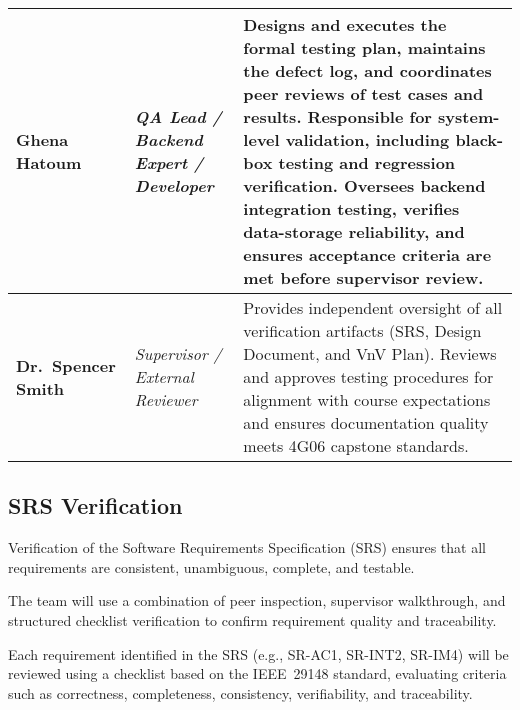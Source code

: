 \documentclass[12pt, titlepage]{article}
\begin{document}
\begin{center}
\begin{longtable}{|>{\raggedright\arraybackslash}p{}|
                    >{\raggedright\arraybackslash}p{}|
                    >{\raggedright\arraybackslash}p{}|}
\textbf{Ghena Hatoum} &
\textit{QA Lead / Backend Expert / Developer} &
Designs and executes the formal testing plan, maintains the defect log, and coordinates peer reviews of test cases and results. Responsible for system-level validation, including black-box testing and regression verification. Oversees backend integration testing, verifies data-storage reliability, and ensures acceptance criteria are met before supervisor review. \\
\hline

\textbf{Dr.\ Spencer Smith} &
\textit{Supervisor / External Reviewer} &
Provides independent oversight of all verification artifacts (SRS, Design Document, and VnV Plan). Reviews and approves testing procedures for alignment with course expectations and ensures documentation quality meets 4G06 capstone standards. \\
\end{longtable}
\end{center}



\subsection{SRS Verification}
\label{subsec:srs-verification}


Verification of the Software Requirements Specification (SRS) ensures that all
requirements are consistent, unambiguous, complete, and testable.

The team will use a combination of peer inspection, supervisor walkthrough, and
structured checklist verification to confirm requirement quality and
traceability.

Each requirement identified in the SRS (e.g., SR-AC1, SR-INT2, SR-IM4) will be
reviewed using a checklist based on the IEEE~29148 standard, evaluating criteria
such as correctness, completeness, consistency, verifiability, and
traceability.
\end{document}
